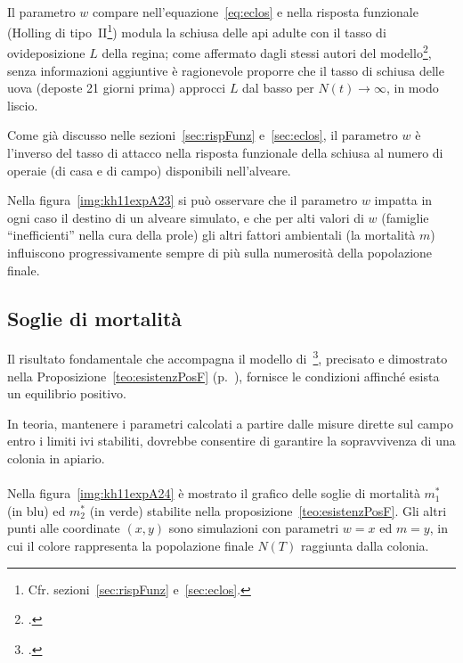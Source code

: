 \paragraph{}
Il parametro $w$ compare nell'equazione~\eqref{eq:eclos} e nella risposta funzionale
(Holling di tipo~II\footnote{Cfr. sezioni~\ref{sec:rispFunz} e~\ref{sec:eclos}.})
modula la schiusa delle api adulte con il tasso di ovideposizione $L$ della regina; come
affermato dagli stessi autori del modello\footcite[2]{khoury2011}, senza informazioni aggiuntive è ragionevole
proporre che il tasso di schiusa delle uova (deposte 21 giorni prima) approcci $L$ dal basso per $N(t) \to \infty$,
in modo liscio.

Come già discusso nelle sezioni~\ref{sec:rispFunz} e~\ref{sec:eclos}, il parametro $w$ è l'inverso del tasso di
attacco nella risposta funzionale della schiusa al numero di operaie (di casa e di campo) disponibili nell'alveare.

Nella figura~\ref{img:kh11expA23} si può osservare che il parametro $w$ impatta in ogni caso il destino di un
alveare simulato, e che per alti valori di $w$ (\ie famiglie ``inefficienti'' nella cura della prole) gli altri
fattori ambientali (\ie la mortalità $m$) influiscono progressivamente sempre di più sulla
numerosità della popolazione finale.


\subsection{Soglie di mortalità}
\label{ssec:simSoglie}
Il risultato fondamentale che accompagna il modello di~\citeauthor{khoury2011}\footcite{khoury2011},
precisato e dimostrato nella
Proposizione~\ref{teo:esistenzPosF} (p.~\pageref{teo:esistenzPosF}), fornisce le condizioni affinché esista un
equilibrio positivo.

In teoria, mantenere i parametri calcolati a partire dalle misure dirette sul campo
entro i limiti ivi stabiliti, dovrebbe consentire di garantire la sopravvivenza di una colonia in apiario.

\paragraph{}
Nella figura~\ref{img:kh11expA24} è mostrato il grafico delle soglie di mortalità $m_1^*$ (in blu) ed
$m_2^*$ (in verde) stabilite nella proposizione~\ref{teo:esistenzPosF}.
Gli altri punti alle coordinate $(x,y)$ sono simulazioni con parametri $w=x$ ed $m=y$, in cui il
colore rappresenta la popolazione finale $N(T)$ raggiunta dalla colonia.

